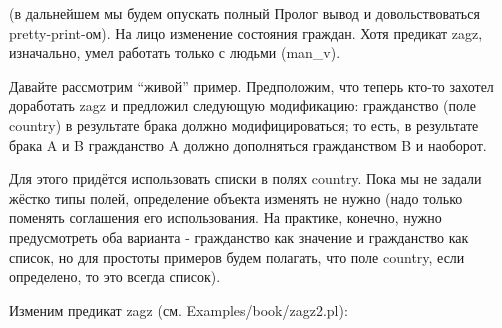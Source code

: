 \documentclass[a4paper]{book}
\begin{document}
(в дальнейшем мы будем опускать полный Пролог вывод и
довольствоваться pretty-print-ом). На лицо изменение состояния
граждан. Хотя предикат zagz, изначально, умел работать только с
людьми (man\_v).

Давайте рассмотрим ``живой'' пример. Предположим, что теперь
кто-то захотел доработать zagz и предложил следующую модификацию:
гражданство (поле country) в результате брака должно
модифицироваться; то есть, в результате брака A и B гражданство
A должно дополняться гражданством B и наоборот.

Для этого придётся использовать списки в полях country. Пока мы
не задали жёстко типы полей, определение объекта изменять не
нужно (надо только поменять соглашения его использования. На
практике, конечно, нужно предусмотреть оба варианта - гражданство
как значение и гражданство как список, но для простоты примеров
будем полагать, что поле country, если определено, то это всегда
список).

Изменим предикат zagz (см. Examples/book/zagz2.pl):
\end{document}
